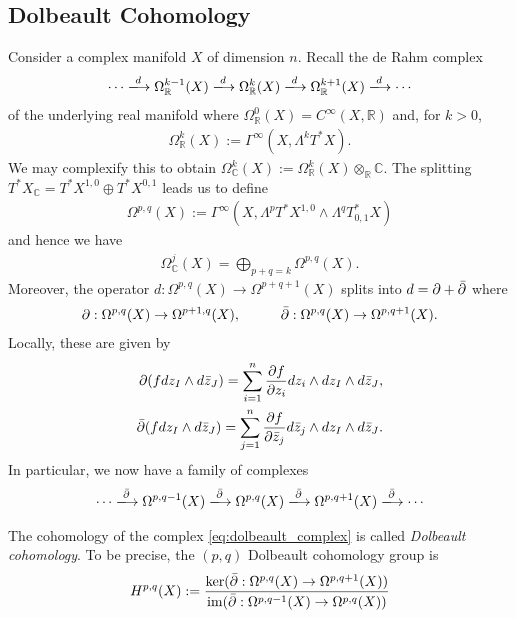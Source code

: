 \documentclass[12pt]{ociamthesis}  %
\begin{document}
\subsection{Dolbeault Cohomology}
\missingcitation

Consider a complex manifold $X$ of dimension $n$. Recall the de Rahm
complex
\begin{align*}
  \cdots \xlongrightarrow{d}
  \Omega_{\mathbb{R}}^{k-1}(X)\xlongrightarrow{d}
  \Omega_{\mathbb{R}}^{k}(X)\xlongrightarrow{d}
  \Omega_{\mathbb{R}}^{k+1}(X)\xlongrightarrow{d}
  \cdots
\end{align*}
of the underlying real manifold where
$\Omega^0_{\mathbb{R}}(X) = C^\infty(X,\mathbb{R})$ and,
for $k > 0$,
\begin{align*}
  \Omega^k_{\mathbb{R}}(X) := \Gamma^\infty(X,\Lambda^k T^*X).
\end{align*}
We may complexify this to obtain
$\Omega^k_{\mathbb C}(X) := \Omega^k_{\mathbb R}(X)\otimes_{\mathbb{R}} \mathbb{C}$.
The splitting $T^*X_\mathbb{C} = T^*X^{1,0} \oplus T^*X^{0,1}$
leads us to define
\begin{align*}
  \Omega^{p,q}(X)
  := \Gamma^\infty(X,\Lambda^p T^*X^{1,0} \wedge\Lambda^q T^*_{0,1}X)
\end{align*}
and hence we have
\begin{align*}
  \Omega^j_{\mathbb C}(X) = \bigoplus_{p+q=k} \Omega^{p,q}(X).
\end{align*}
Moreover, the operator $d : \Omega^{p,q}(X) \to \Omega^{p+q+1}(X)$
splits into $d = \partial + \bar{\partial}$ where
\begin{align*}
  \partial : \Omega^{p,q}(X) \to \Omega^{p+1,q}(X),\hspace{1cm}
  \bar{\partial} : \Omega^{p,q}(X) \to \Omega^{p,q+1}(X).
\end{align*}
Locally, these are given by
\begin{align*}
  \partial (f dz_I \wedge d\bar z_J) = \sum_{i=1}^n \frac{\partial f}{\partial z_i} dz_i\wedge dz_I \wedge d\bar z_J, \\
  \bar{\partial} (f dz_I \wedge d\bar z_J) = \sum_{j=1}^n \frac{\partial f}{\partial \bar z_j} d\bar z_j\wedge dz_I \wedge d\bar z_J.
\end{align*}
In particular, we now have a family of complexes
\begin{align}\label{eq:dolbeault_complex}
  \cdots \xlongrightarrow{\dol}
  \Omega^{p,q-1}(X)\xlongrightarrow{\dol}
  \Omega^{p,q}(X)\xlongrightarrow{\dol}
  \Omega^{p,q+1}(X)\xlongrightarrow{\dol}
  \cdots
\end{align}
\begin{definition}
  The cohomology of the complex \ref{eq:dolbeault_complex} is
  called \emph{Dolbeault cohomology}. To be precise, the
  $(p,q)$ Dolbeault cohomology group is
  \begin{align*}
    H^{p,q}(X) := \frac{
      \ker(\bar{\partial} : \Omega^{p,q}(X) \to \Omega^{p,q+1}(X))
    }{
      \operatorname{im}(\bar{\partial} : \Omega^{p,q-1}(X) \to \Omega^{p,q}(X))
    }
  \end{align*}
\end{definition}
\end{document}

